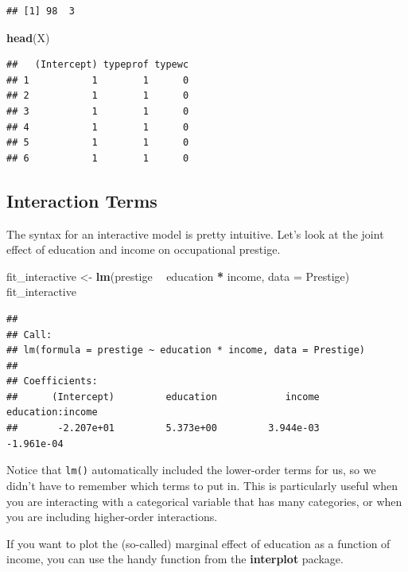 \documentclass[12pt,oneside,openany]{book}
\newenvironment{Shaded}{\begin{snugshade}}{\end{snugshade}}
\newcommand{\KeywordTok}[1]{\textcolor[rgb]{0.13,0.29,0.53}{\textbf{#1}}}
\newcommand{\DataTypeTok}[1]{\textcolor[rgb]{0.13,0.29,0.53}{#1}}
\newcommand{\StringTok}[1]{\textcolor[rgb]{0.31,0.60,0.02}{#1}}
\newcommand{\OperatorTok}[1]{\textcolor[rgb]{0.81,0.36,0.00}{\textbf{#1}}}
\newcommand{\NormalTok}[1]{#1}
\begin{document}
\begin{verbatim}
## [1] 98  3
\end{verbatim}

\begin{Shaded}
\begin{Highlighting}[]
\KeywordTok{head}\NormalTok{(X)}
\end{Highlighting}
\end{Shaded}

\begin{verbatim}
##   (Intercept) typeprof typewc
## 1           1        1      0
## 2           1        1      0
## 3           1        1      0
## 4           1        1      0
## 5           1        1      0
## 6           1        1      0
\end{verbatim}

\subsection{Interaction Terms}\label{interaction-terms-1}

The syntax for an interactive model is pretty intuitive. Let's look at
the joint effect of education and income on occupational prestige.

\begin{Shaded}
\begin{Highlighting}[]
\NormalTok{fit_interactive <-}\StringTok{ }\KeywordTok{lm}\NormalTok{(prestige }\OperatorTok{~}\StringTok{ }\NormalTok{education }\OperatorTok{*}\StringTok{ }\NormalTok{income, }\DataTypeTok{data =}\NormalTok{ Prestige)}
\NormalTok{fit_interactive}
\end{Highlighting}
\end{Shaded}

\begin{verbatim}
## 
## Call:
## lm(formula = prestige ~ education * income, data = Prestige)
## 
## Coefficients:
##      (Intercept)         education            income  education:income  
##       -2.207e+01         5.373e+00         3.944e-03        -1.961e-04
\end{verbatim}

Notice that \texttt{lm()} automatically included the lower-order terms
for us, so we didn't have to remember which terms to put in. This is
particularly useful when you are interacting with a categorical variable
that has many categories, or when you are including higher-order
interactions.

If you want to plot the (so-called) marginal effect of education as a
function of income, you can use the handy function from the
\textbf{interplot} package.
\end{document}
